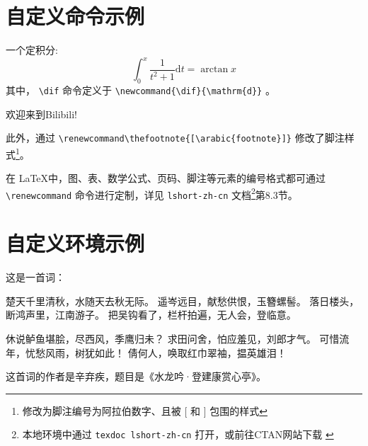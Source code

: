 \documentclass{article}
\newcommand{\dif}{\mathrm{d}}   %
\newcommand{\link}[1]{\href{#1}{\textcolor{THUPurple}{\faLink}}}  %
\renewcommand\thefootnote{[\arabic{footnote}]}  %
\newenvironment{myQuotation}{%
    \vspace{1ex}\itshape\color{THUPurple}%
}{\vspace{1ex}}   %
\begin{document}
    
\section{自定义命令示例}
    
    一个定积分:
    \[
        \int_{0}^{x} \frac{1}{t^2+1} \dif t = \arctan x
    \]
其中， \verb|\dif| 命令定义于 \verb|\newcommand{\dif}{\mathrm{d}}| 。

    欢迎来到Bilibili! \link{https://www.bilibili.com}

    此外，通过 \verb|\renewcommand\thefootnote{[\arabic{footnote}]}| 修改了脚注样式\footnote{修改为脚注编号为阿拉伯数字、且被 [ 和 ] 包围的样式}。

    在 \LaTeX 中，图、表、数学公式、页码、脚注等元素的编号格式都可通过 \verb|\renewcommand| 命令进行定制，详见 \verb|lshort-zh-cn| 文档\footnote{本地环境中通过 \texttt{texdoc lshort-zh-cn} 打开，或前往CTAN网站下载 \link{https://ctan.org/pkg/lshort-zh-cn}}第8.3节。

\section{自定义环境示例}

    这是一首词：

    \begin{myQuotation}
        楚天千里清秋，水随天去秋无际。
        遥岑远目，献愁供恨，玉簪螺髻。
        落日楼头，断鸿声里，江南游子。
        把吴钩看了，栏杆拍遍，无人会，登临意。
        
        休说鲈鱼堪脍，尽西风，季鹰归未？
        求田问舍，怕应羞见，刘郎才气。
        可惜流年，忧愁风雨，树犹如此！
        倩何人，唤取红巾翠袖，揾英雄泪！
    \end{myQuotation}

    这首词的作者是辛弃疾，题目是《水龙吟·登建康赏心亭》。
\end{document}
